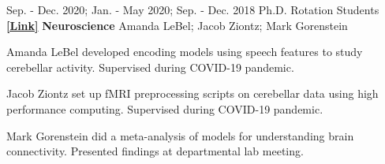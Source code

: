 \begin{cventries}
  \cventry
    {Sep. - Dec. 2020; Jan. - May 2020; Sep. - Dec. 2018} %
    {Ph.D. Rotation Students {\href{https://docs.google.com/presentation/d/1KqypbxIWP9h1bFufipUan3MAQW_0ZS7i/edit?usp=sharing&ouid=110847987931723045299&rtpof=true&sd=true}{\textbf{[Link]}}}} %
    {\textbf{Neuroscience}}
    {Amanda LeBel; Jacob Ziontz; Mark Gorenstein}
   {
      \begin{cvitems} %
        \item {Amanda LeBel developed encoding models using speech features to study cerebellar activity. Supervised during COVID-19 pandemic.}
        \item {Jacob Ziontz set up fMRI preprocessing scripts on cerebellar data using high performance computing. Supervised during COVID-19 pandemic.}
        \item {Mark Gorenstein did a meta-analysis of models for understanding brain connectivity. Presented findings at departmental lab meeting.}
      \end{cvitems}
    }
    

\end{cventries}
